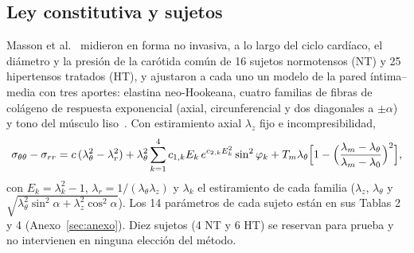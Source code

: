 \subsection{Ley constitutiva y sujetos}
Masson et al.~\cite{masson} midieron en forma no invasiva, a lo largo del ciclo cardíaco, el diámetro y la presión de la carótida común de 16 sujetos normotensos (NT) y 25 hipertensos tratados (HT), y ajustaron a cada uno un modelo de la pared íntima--media con tres aportes: elastina neo-Hookeana, cuatro familias de fibras de colágeno de respuesta exponencial (axial, circunferencial y dos diagonales a $\pm\alpha$)~\cite{holzapfel} y tono del músculo liso~\cite{rachev}. Con estiramiento axial $\lambda_z$ fijo e incompresibilidad,
\begin{equation}\label{eq:masson}
\sigma_{\theta\theta}-\sigma_{rr}=c\,(\lambda_\theta^2-\lambda_r^2)+\lambda_\theta^2\sum_{k=1}^{4}c_{1,k}E_k\,e^{c_{2,k}E_k^2}\sin^2\varphi_k+T_m\lambda_\theta\Bigl[1-\Bigl(\frac{\lambda_m-\lambda_\theta}{\lambda_m-\lambda_0}\Bigr)^2\Bigr],
\end{equation}
con $E_k=\lambda_k^2-1$, $\lambda_r=1/(\lambda_\theta\lambda_z)$ y $\lambda_k$ el estiramiento de cada familia ($\lambda_z$, $\lambda_\theta$ y $\sqrt{\lambda_\theta^2\sin^2\alpha+\lambda_z^2\cos^2\alpha}$). Los 14 parámetros de cada sujeto están en sus Tablas 2 y 4 (Anexo~\ref{sec:anexo}). Diez sujetos (4 NT y 6 HT) se reservan para prueba y no intervienen en ninguna elección del método.

